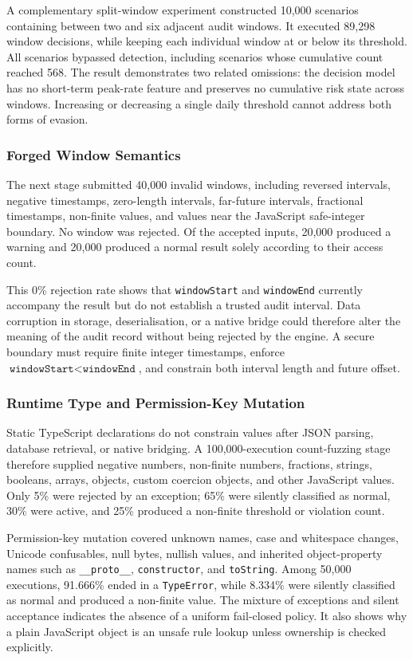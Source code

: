 A complementary split-window experiment constructed 10,000 scenarios containing between two and six adjacent audit windows. It executed 89,298 window decisions, while keeping each individual window at or below its threshold. All scenarios bypassed detection, including scenarios whose cumulative count reached 568. The result demonstrates two related omissions: the decision model has no short-term peak-rate feature and preserves no cumulative risk state across windows. Increasing or decreasing a single daily threshold cannot address both forms of evasion.

\subsubsection{Forged Window Semantics}

The next stage submitted 40,000 invalid windows, including reversed intervals, negative timestamps, zero-length intervals, far-future intervals, fractional timestamps, non-finite values, and values near the JavaScript safe-integer boundary. No window was rejected. Of the accepted inputs, 20,000 produced a warning and 20,000 produced a normal result solely according to their access count.

This 0\% rejection rate shows that \texttt{windowStart} and \texttt{windowEnd} currently accompany the result but do not establish a trusted audit interval. Data corruption in storage, deserialisation, or a native bridge could therefore alter the meaning of the audit record without being rejected by the engine. A secure boundary must require finite integer timestamps, enforce $\texttt{windowStart}<\texttt{windowEnd}$, and constrain both interval length and future offset.

\subsubsection{Runtime Type and Permission-Key Mutation}

Static TypeScript declarations do not constrain values after JSON parsing, database retrieval, or native bridging. A 100,000-execution count-fuzzing stage therefore supplied negative numbers, non-finite numbers, fractions, strings, booleans, arrays, objects, custom coercion objects, and other JavaScript values. Only 5\% were rejected by an exception; 65\% were silently classified as normal, 30\% were active, and 25\% produced a non-finite threshold or violation count.

Permission-key mutation covered unknown names, case and whitespace changes, Unicode confusables, null bytes, nullish values, and inherited object-property names such as \texttt{\_\_proto\_\_}, \texttt{constructor}, and \texttt{toString}. Among 50,000 executions, 91.666\% ended in a \texttt{TypeError}, while 8.334\% were silently classified as normal and produced a non-finite value. The mixture of exceptions and silent acceptance indicates the absence of a uniform fail-closed policy. It also shows why a plain JavaScript object is an unsafe rule lookup unless ownership is checked explicitly.

